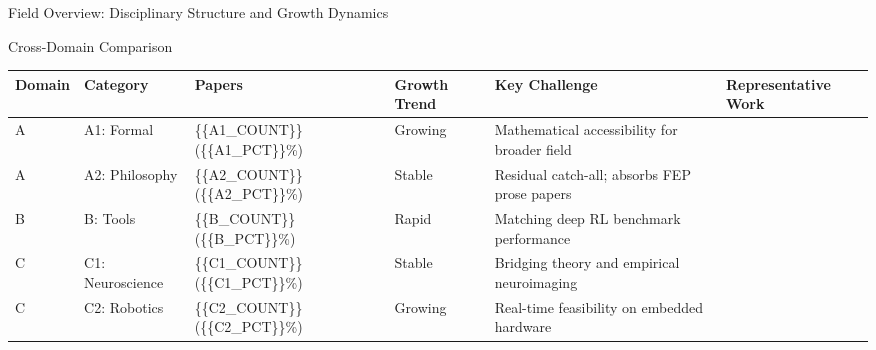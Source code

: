 \documentclass[
  ignorenonframetext,
]{beamer}
\newcounter{none} %
\begin{document}
\begin{frame}{Field Overview: Disciplinary Structure and Growth Dynamics
\label{sec:field_overview}}
\begin{block}{Cross-Domain Comparison}
\protect{}\label{cross-domain-comparison}
{\def\LTcaptype{none} %
\begin{longtable}[]{@{}
  >{\raggedright\arraybackslash}p{}
  >{\raggedright\arraybackslash}p{}
  >{\raggedright\arraybackslash}p{}
  >{\raggedright\arraybackslash}p{}
  >{\raggedright\arraybackslash}p{}
  >{\raggedright\arraybackslash}p{}@{}}
\toprule\noalign{}
\begin{minipage}[b]{\linewidth}\raggedright
Domain
\end{minipage} & \begin{minipage}[b]{\linewidth}\raggedright
Category
\end{minipage} & \begin{minipage}[b]{\linewidth}\raggedright
Papers
\end{minipage} & \begin{minipage}[b]{\linewidth}\raggedright
Growth Trend
\end{minipage} & \begin{minipage}[b]{\linewidth}\raggedright
Key Challenge
\end{minipage} & \begin{minipage}[b]{\linewidth}\raggedright
Representative Work
\end{minipage} \\
\midrule\noalign{}
\endhead
A & A1: Formal & \{\{A1\_COUNT\}\} (\{\{A1\_PCT\}\}\%) & Growing &
Mathematical accessibility for broader field &
\citep{sakthivadivel2023bayesian} \\
A & A2: Philosophy & \{\{A2\_COUNT\}\} (\{\{A2\_PCT\}\}\%) & Stable &
Residual catch-all; absorbs FEP prose papers &
\citep{friston2010free} \\
B & B: Tools & \{\{B\_COUNT\}\} (\{\{B\_PCT\}\}\%) & Rapid & Matching
deep RL benchmark performance & \citep{fountas2020deep} \\
C & C1: Neuroscience & \{\{C1\_COUNT\}\} (\{\{C1\_PCT\}\}\%) & Stable &
Bridging theory and empirical neuroimaging &
\citep{clark2013whatever} \\
C & C2: Robotics & \{\{C2\_COUNT\}\} (\{\{C2\_PCT\}\}\%) & Growing &
Real-time feasibility on embedded hardware &
\citep{lanillos2021active} \\

\end{longtable}}
\end{block}
\end{frame}
\end{document}
